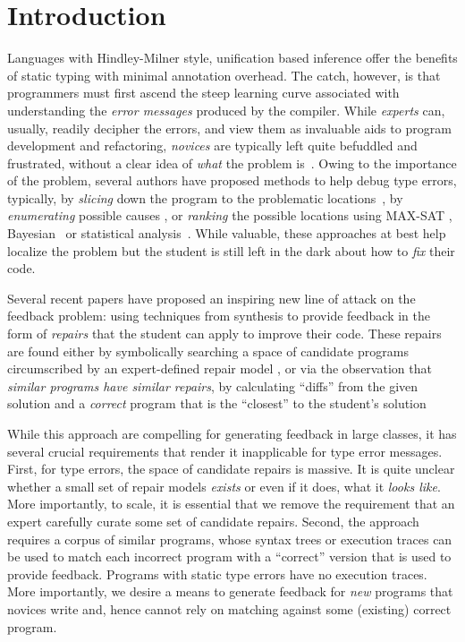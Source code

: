 \section{Introduction}
\label{sec:intro}

%
Languages with Hindley-Milner style, unification based inference 
offer the benefits of static typing with minimal annotation overhead.
The catch, however, is that programmers must first ascend the steep 
learning curve associated with understanding the \emph{error messages} 
produced by the compiler. 
%
While \emph{experts} can, usually, readily decipher the errors, and 
view them as invaluable aids to program development and refactoring,
\emph{novices} are typically left quite befuddled and frustrated, 
without a clear idea of \emph{what} the problem is~\cite{Wand1986-nw}.
%
Owing to the importance of the problem, several authors 
have proposed methods to help debug type errors, typically, 
by \emph{slicing} down the program to the problematic locations~\cite{Haack2003-vc, Rahli2015-tt}, 
by \emph{enumerating} possible causes \cite{Lerner2007-dt, Chen2014-gd},
or \emph{ranking} the possible locations using MAX-SAT 
\cite{Pavlinovic2014-mr}, Bayesian~\cite{Zhang2014-lv} 
or statistical analysis~\cite{Seidel:2017}.
%
While valuable, these approaches at best help localize 
the problem but the student is still left in the dark 
about how to \emph{fix} their code.

%
Several recent papers have proposed an inspiring new line of 
attack on the feedback problem: using techniques from synthesis 
to provide feedback in the form of \emph{repairs} that the student 
can apply to improve their code. 
%
These repairs are found either by symbolically searching a space 
of candidate programs circumscribed by an expert-defined repair 
model \cite{singh2013,glassman}, or via the observation that 
\emph{similar programs have similar repairs}, \ie by calculating 
``diffs'' from the given solution and a \emph{correct} program 
that is the ``closest'' to the student's solution ~\cite{PLDI18a,PLDI18b}

While this approach are compelling for generating feedback in large
classes, it has several crucial requirements that render it inapplicable 
for type error messages.
%
First, for type errors, the space of candidate repairs is massive. 
It is quite unclear whether a small set of repair models \emph{exists} 
or even if it does, what it \emph{looks like}. More importantly, 
to scale, it is essential that we remove the requirement that an 
expert carefully curate some set of candidate repairs.
%
Second, the approach requires a corpus of similar programs, 
whose syntax trees or execution traces can be used to match 
each incorrect program with a ``correct'' version that is 
used to provide feedback. Programs with static type errors 
have no execution traces. 
%
More importantly, we desire a means to generate feedback 
for \emph{new} programs that novices write and, hence 
cannot rely on matching against some (existing) correct 
program.

